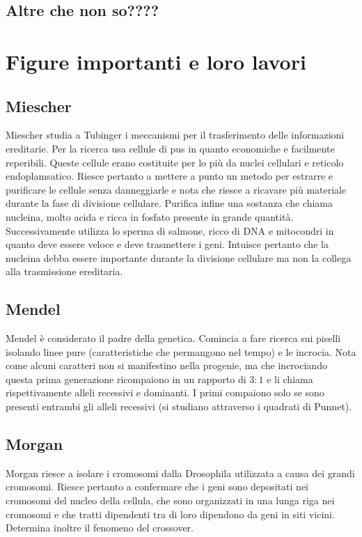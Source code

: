 \subsection{Altre che non so????}

\section{Figure importanti e loro lavori}
\subsection{Miescher}
Miescher studia a Tubinger i meccanismi per il trasferimento delle informazioni ereditarie. Per la ricerca usa cellule di pus in quanto economiche e facilmente reperibili. Queste cellule
erano costituite per lo pi\`u da nuclei cellulari e reticolo endoplamsatico. Riesce pertanto a mettere a punto un metodo per estrarre e purificare le cellule senza danneggiarle e nota 
che riesce a ricavare pi\`u materiale durante la fase di divisione cellulare. Purifica infine una sostanza che chiama nucleina, molto acida e ricca in fosfato presente in grande 
quantit\`a. Successivamente utilizza lo sperma di salmone, ricco di DNA e mitocondri in quanto deve essere veloce e deve trasmettere i geni. Intuisce pertanto che la nucleina debba 
essere importante durante la divisione cellulare ma non la collega alla trasmissione ereditaria. 
\subsection{Mendel}
Mendel \`e considerato il padre della genetica. Comincia a fare ricerca sui piselli isolando linee pure (caratteristiche che permangono nel tempo) e le incrocia. Nota come alcuni 
caratteri non si manifestino nella progenie, ma che incrociando questa prima generazione ricompaiono in un rapporto di $3:1$ e li chiama rispettivamente alleli recessivi e dominanti. 
I primi compaiono solo se sono presenti entrambi gli alleli recessivi (si studiano attraverso i quadrati di Punnet). 
\subsection{Morgan}
Morgan riesce a isolare i cromosomi dalla Drosophila utilizzata a causa dei grandi cromosomi. Riesce pertanto a confermare che i geni sono depositati nei cromosomi del nucleo della
cellula, che sono organizzati in una lunga riga nei cromosomi e che tratti dipendenti tra di loro dipendono da geni in siti vicini. Determina inoltre il fenomeno del crossover. 
